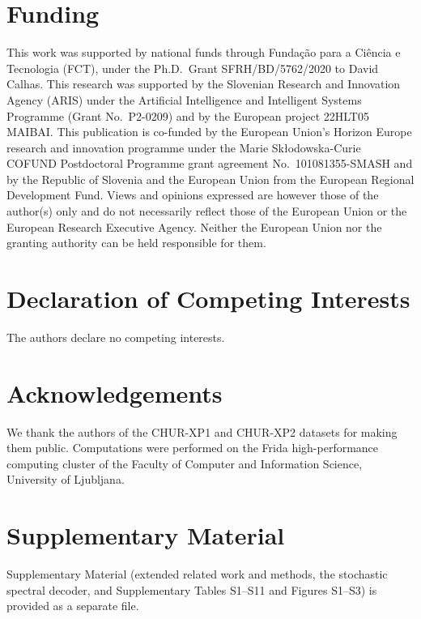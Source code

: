 \documentclass[]{imag-ms-template}
\begin{document}
\section*{Funding}
This work was supported by national funds through Funda\c{c}\~{a}o para a Ci\^{e}ncia e Tecnologia (FCT), under the Ph.D.\ Grant SFRH/BD/5762/2020 to David Calhas. This research was supported by the Slovenian Research and Innovation Agency (ARIS) under the Artificial Intelligence and Intelligent Systems Programme (Grant No.~P2-0209) and by the European project 22HLT05 MAIBAI. This publication is co-funded by the European Union's Horizon Europe research and innovation programme under the Marie Sk{\l}odowska-Curie COFUND Postdoctoral Programme grant agreement No.~101081355-SMASH and by the Republic of Slovenia and the European Union from the European Regional Development Fund. Views and opinions expressed are however those of the author(s) only and do not necessarily reflect those of the European Union or the European Research Executive Agency. Neither the European Union nor the granting authority can be held responsible for them.

\section*{Declaration of Competing Interests}
The authors declare no competing interests.

\section*{Acknowledgements}
We thank the authors of the CHUR-XP1 and CHUR-XP2 datasets for making them public. Computations were performed on the Frida high-performance computing cluster of the Faculty of Computer and Information Science, University of Ljubljana.

\section*{Supplementary Material}
Supplementary Material (extended related work and methods, the stochastic spectral decoder, and Supplementary Tables S1--S11 and Figures S1--S3) is provided as a separate file.

\printbibliography
\end{document}
